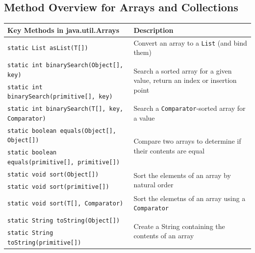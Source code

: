 \subsection{Method Overview for Arrays and Collections}
\begin{center}
\begin{tabular}{lp{}}
    \textbf{Key Methods in java.util.Arrays} & \textbf{Description} \\
    \hline
    \verb#static List asList(T[])# & Convert an array to a \verb#List# (and 
    bind them) \\
    \hline
    \verb#static int binarySearch(Object[], key)# & 
    \multirow{2}{0.4\textwidth}{Search a sorted array for a given value, return 
    an index or insertion point} \\
    \verb#static int binarySearch(primitive[], key)# & \\
    \hline
    \verb#static int binarySearch(T[], key, Comparator)# & Search a 
    \verb#Comparator#-sorted array for a value \\
    \hline
    \verb#static boolean equals(Object[], Object[])# & 
    \multirow{2}{0.4\textwidth}{Compare two arrays to determine if their 
    contents are equal} \\
    \verb#static boolean equals(primitive[], primitive[])# & \\
    \hline
    \verb#static void sort(Object[])# & \multirow{2}{0.4\textwidth}{Sort the 
    elements of an array by natural order} \\
    \verb#static void sort(primitive[])# & \\
    \hline
    \verb#static void sort(T[], Comparator)# & Sort the elemetns of an array 
    using a \verb#Comparator# \\
    \hline
    \verb#static String toString(Object[])# & 
    \multirow{2}{0.4\textwidth}{Create a String containing the contents of an 
    array} \\
    \verb#static String toString(primitive[])# & \\
\end{tabular}


\end{center}
